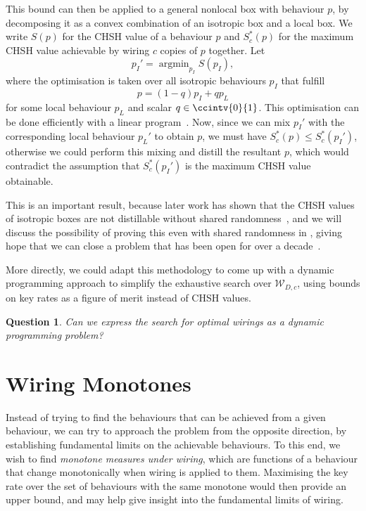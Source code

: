 \documentclass[10pt, a4paper]{article}
\numberwithin{equation}{section} %
\theoremstyle{definition}
\theoremstyle{plain}
\newtheorem{question}{Question}
\DeclareMathOperator*{\argmin}{argmin}
\newcommand{\?}{\mathrel{?}} %
\newcommand{\sW}{\mathcal{W}}
\begin{document}
                    This bound can then be applied to a general nonlocal box with behaviour \(p\), by decomposing it as a convex combination of an isotropic box and a local box. We write \(S(p)\) for the CHSH value of a behaviour \(p\) and \(S^*_c(p)\) for the maximum CHSH value achievable by wiring \(c\) copies of \(p\) together. Let
                    \[ p_I' = \argmin_{p_I} S(p_I), \]
                    where the optimisation is taken over all isotropic behaviours \(p_I\) that fulfill
                    \[ p = (1-q)p_I + qp_L \]
                    for some local behaviour \(p_L\) and scalar \(q \in\ccintv{0}{1}\). This optimisation can be done efficiently with a linear program~\cite{LocalPartLP}. Now, since we can mix \(p_I'\) with the corresponding local behaviour \(p_L'\) to obtain \(p\), we must have \(S^*_c(p) \leq S^*_c(p_I')\), otherwise we could perform this mixing and distill the resultant \(p\), which would contradict the assumption that \(S^*_c(p_I')\) is the maximum CHSH value obtainable.

                    This is an important result, because later work has shown that the CHSH values of isotropic boxes are not distillable without shared randomness~\cite{NLMonotones}, and we will discuss the possibility of proving this even with shared randomness in , giving hope that we can close a problem that has been open for over a decade~\cite{NLLimits, DistillationBounds}.

                    More directly, we could adapt this methodology to come up with a dynamic programming approach to simplify the exhaustive search over \(\sW_{D,c}\), using bounds on key rates as a figure of merit instead of CHSH values.
                  \begin{question}
                    Can we express the search for optimal wirings as a dynamic programming problem?
                  \end{question}

                  \section{Wiring Monotones}\label{sec:wirmono}

                  Instead of trying to find the behaviours that can be achieved from a given behaviour, we can try to approach the problem from the opposite direction, by establishing fundamental limits on the achievable behaviours. To this end, we wish to find \emph{monotone measures under wiring}, which are functions of a behaviour that change monotonically when wiring is applied to them. Maximising the key rate over the set of behaviours with the same monotone would then provide an upper bound, and may help give insight into the fundamental limits of wiring.
\end{document}
